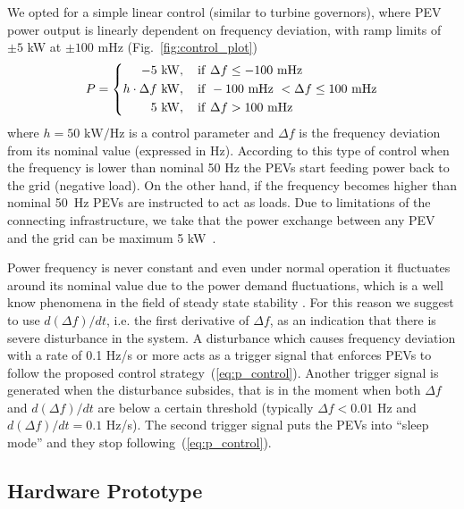 \documentclass[final,12pt]{elsarticle}
\begin{document}
We opted for a simple linear control (similar to turbine governors), where PEV
power output is linearly dependent on frequency deviation, with ramp limits of
$\pm 5$ kW at $\pm100$ mHz (Fig.~\ref{fig:control_plot})
\begin{equation}
P = \left\{
\begin{aligned}
-5~&{\rm kW}, \quad {\rm if~} \Delta f \le -100 {\rm ~mHz}\\
h \cdot \Delta f~&{\rm kW}, \quad {\rm if~} -100 {\rm ~mHz~} < \Delta f \le 100 {\rm ~mHz}\\
5~&{\rm kW}, \quad {\rm if~} \Delta f > 100 {\rm ~mHz}\\
\end{aligned}
\right.
\label{eq:p_control}
\end{equation}
where $h = 50 \mbox{ kW/Hz}$ is a control parameter and $\Delta f$ is the
frequency deviation from its nominal value (expressed in Hz).
According to this type of control when the frequency is lower than nominal 50 Hz
the PEVs start feeding power back to the grid (negative load). On the other
hand, if the frequency becomes higher than nominal 50~Hz 
PEVs are instructed to act as loads. Due to limitations of the connecting infrastructure, we take that the power exchange between any PEV and the grid can be maximum 5
kW~\cite{kempton2005vehicle1}.

Power frequency is never constant and even under normal operation it
fluctuates around its nominal value due to the power demand fluctuations, which
is a well know phenomena in the field of steady state stability
\cite{machowski2011power}. For this reason we suggest to use $d(\Delta f)/dt$,
i.e. the first derivative of $\Delta f$, as an indication that there is severe
disturbance in the system. A disturbance which causes frequency deviation with a
rate of 0.1 Hz/s or more acts as a trigger signal that enforces PEVs to follow
the proposed control strategy~(\ref{eq:p_control}). Another trigger signal is generated when the
disturbance subsides, that is in the moment when both $\Delta f$ and $d(\Delta
f)/dt$ are below a certain threshold (typically $\Delta f < 0.01$ Hz and
$d(\Delta f)/dt = 0.1$ Hz/s). The second trigger signal puts the PEVs into
``sleep mode'' and they stop following~(\ref{eq:p_control}).

\subsection{Hardware Prototype}
\label{hardware}
\end{document}
